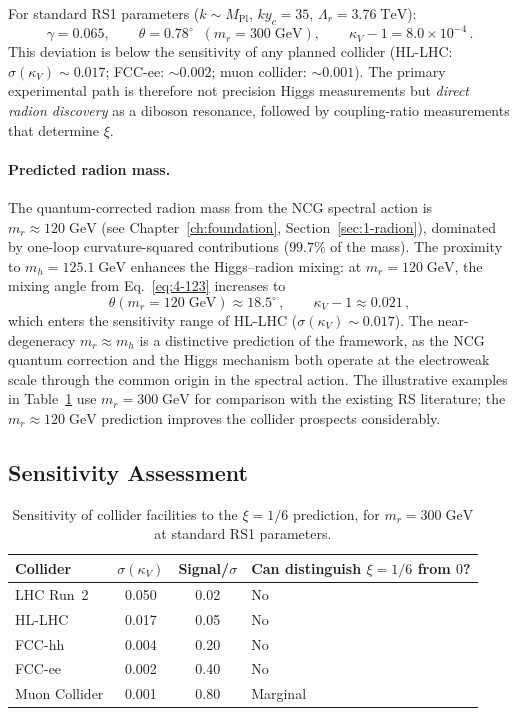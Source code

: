 For standard RS1 parameters ($k \sim M_{\mathrm{Pl}}$, $ky_c = 35$, $\Lambda_r = 3.76\;\mathrm{TeV}$):
\begin{equation}
  \gamma = 0.065, \qquad \theta = 0.78^\circ \;\;(m_r = 300\;\mathrm{GeV}), \qquad
  \kappa_V - 1 = 8.0 \times 10^{-4}\,.
  \label{eq:4-126}
\end{equation}
This deviation is below the sensitivity of any planned collider (HL-LHC: $\sigma(\kappa_V) \sim 0.017$; FCC-ee: $\sim 0.002$; muon collider: $\sim 0.001$). The primary experimental path is therefore not precision Higgs measurements but \emph{direct radion discovery} as a diboson resonance, followed by coupling-ratio measurements that determine $\xi$.

\paragraph{Predicted radion mass.} The quantum-corrected radion mass from the NCG spectral action is $m_r \approx 120\;\mathrm{GeV}$ (see Chapter~\ref{ch:foundation}, Section~\ref{sec:1-radion}), dominated by one-loop curvature-squared contributions ($99.7\%$ of the mass). The proximity to $m_h = 125.1\;\mathrm{GeV}$ enhances the Higgs--radion mixing: at $m_r = 120\;\mathrm{GeV}$, the mixing angle from Eq.~\eqref{eq:4-123} increases to
\begin{equation}
  \theta(m_r = 120\;\mathrm{GeV}) \approx 18.5^\circ\,, \qquad
  \kappa_V - 1 \approx 0.021\,,
  \label{eq:4-126b}
\end{equation}
which enters the sensitivity range of HL-LHC ($\sigma(\kappa_V) \sim 0.017$). The near-degeneracy $m_r \approx m_h$ is a distinctive prediction of the framework, as the NCG quantum correction and the Higgs mechanism both operate at the electroweak scale through the common origin in the spectral action. The illustrative examples in Table~\ref{tab:4-collider} use $m_r = 300\;\mathrm{GeV}$ for comparison with the existing RS literature; the $m_r \approx 120\;\mathrm{GeV}$ prediction improves the collider prospects considerably.

\subsection{Sensitivity Assessment}
\label{sec:4-sensitivity}

\begin{table}[htbp]
\centering
\caption{Sensitivity of collider facilities to the $\xi = 1/6$ prediction, for $m_r = 300\;\mathrm{GeV}$ at standard RS1 parameters.}
\label{tab:4-collider}
\small
\begin{tabular}{@{}lccl@{}}
\toprule
Collider & $\sigma(\kappa_V)$ & Signal/$\sigma$ & Can distinguish $\xi = 1/6$ from $0$? \\
\midrule
LHC Run~2 & 0.050 & 0.02 & No \\
HL-LHC & 0.017 & 0.05 & No \\
FCC-hh & 0.004 & 0.20 & No \\
FCC-ee & 0.002 & 0.40 & No \\
Muon Collider & 0.001 & 0.80 & Marginal \\
\bottomrule
\end{tabular}
\end{table}

